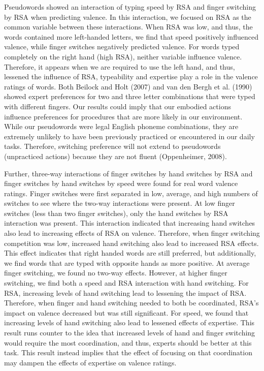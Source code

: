 \documentclass[
  english,
  man,mask]{apa7}
\begin{document}
Pseudowords showed an interaction of typing speed by RSA and finger switching by RSA when predicting valence. In this interaction, we focused on RSA as the common variable between these interactions. When RSA was low, and thus, the words contained more left-handed letters, we find that speed positively influenced valence, while finger switches negatively predicted valence. For words typed completely on the right hand (high RSA), neither variable influence valence. Therefore, it appears when we are required to use the left hand, and thus, lessened the influence of RSA, typeability and expertise play a role in the valence ratings of words. Both Beilock and Holt (2007) and van den Bergh et al. (1990) showed expert preferences for two and three letter combinations that were typed with different fingers. Our results could imply that our embodied actions influence preferences for procedures that are more likely in our environment. While our pseudowords were legal English phoneme combinations, they are extremely unlikely to have been previously practiced or encountered in our daily tasks. Therefore, switching preference will not extend to pseudowords (unpracticed actions) because they are not fluent (Oppenheimer, 2008).

Further, three-way interactions of finger switches by hand switches by RSA and finger switches by hand switches by speed were found for real word valence ratings. Finger switches were first separated in low, average, and high numbers of switches to see where the two-way interactions were present. At low finger switches (less than two finger switches), only the hand switches by RSA interaction was present. This interaction indicated that increasing hand switches also lead to increasing effects of RSA on valence. Therefore, when finger switching competition was low, increased hand switching also lead to increased RSA effects. This effect indicates that right handed words are still preferred, but additionally, we find words that are typed with opposite hands as more positive. At average finger switching, we found no two-way effects. However, at higher finger switching, we find both a speed and RSA interaction with hand switching. For RSA, increasing levels of hand switching lead to lessening the impact of RSA. Therefore, when finger and hand switching needed to both be coordinated, RSA's impact on valence decreased but was still significant. For speed, we found that increasing levels of hand switching also lead to lessened effects of expertise. This result runs counter to the idea that increased levels of hand and finger switching would require the most coordination, and thus, experts should be better at this task. This result instead implies that the effect of focusing on that coordination may dampen the effects of expertise on valence ratings.
\end{document}
